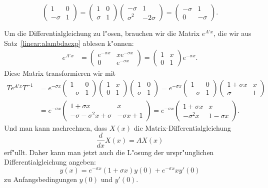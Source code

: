 \begin{beispiel}
\[\begin{pmatrix}
      1&0\\
-\sigma&1
\end{pmatrix}
=
\begin{pmatrix}
     1&0\\
\sigma&1
\end{pmatrix}
\begin{pmatrix}
-\sigma  &1\\
 \sigma^2&-2\sigma
\end{pmatrix}
=
\begin{pmatrix}
-\sigma&1\\
      0&-\sigma
\end{pmatrix}.
\]

Um die Differentialgleichung zu l"osen, brauchen wir die Matrix
$e^{A'x}$, die wir aus Satz~\ref{linear:alambdaexp} ablesen k"onnen:
\begin{align*}
e^{A'x}
&=
\begin{pmatrix}
e^{-\sigma x}&xe^{-\sigma x}\\
       0     & e^{-\sigma x}
\end{pmatrix}
=
\begin{pmatrix}
1&x\\
0&1
\end{pmatrix}
e^{-\sigma x}.
\end{align*}
Diese Matrix transformieren wir mit 
\begin{align*}
Te^{A'x}T^{-1}
&=
e^{-\sigma x}
\begin{pmatrix}
      1&0\\
-\sigma&1
\end{pmatrix}
\begin{pmatrix}
1&x\\
0&1
\end{pmatrix}
\begin{pmatrix}
     1&0\\
\sigma&1
\end{pmatrix}
=
e^{-\sigma x}
\begin{pmatrix}
      1&0\\
-\sigma&1
\end{pmatrix}
\begin{pmatrix}
1+\sigma x&x\\
  \sigma  &1
\end{pmatrix}
\\
&=
e^{-\sigma x}
\begin{pmatrix}
1+\sigma x& x\\
-\sigma-\sigma^2 x+\sigma&-\sigma x+1
\end{pmatrix}
=
e^{-\sigma x}
\begin{pmatrix}
1+\sigma   x&         x\\
 -\sigma^2 x&1-\sigma x
\end{pmatrix}.
\end{align*}
Und man kann nachrechnen, dass $X(x)$ die Matrix-Differentialgleichung
\[
\frac{d}{dx}X(x)=AX(x)
\]
erf"ullt.
Daher kann man jetzt auch die L"osung der urspr"unglichen 
Differentialgleichung angeben:
\[
y(x)=e^{-\sigma x}(1+\sigma x)y(0) + e^{-\sigma x}xy'(0)
\]
zu Anfangsbedingungen $y(0)$ und $y'(0)$.
\end{beispiel}

